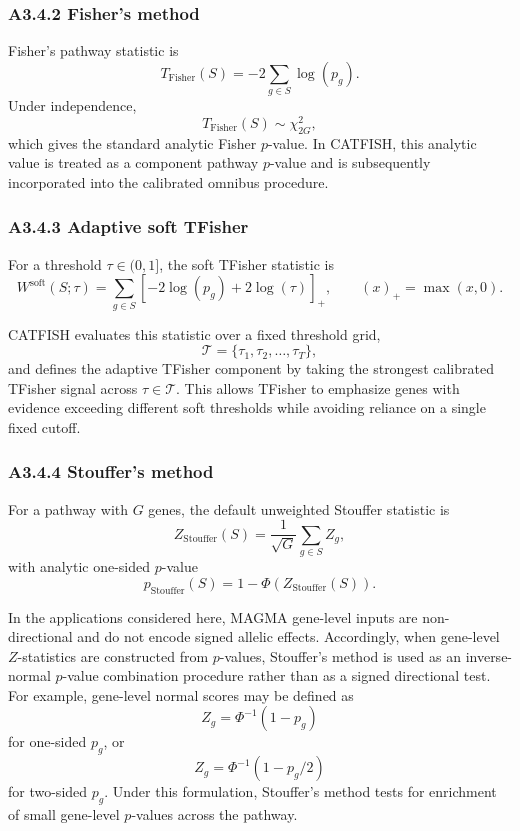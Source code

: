 \documentclass[unnumsec,webpdf,contemporary,large]{oup-authoring-template}%
\theoremstyle{thmstyleone}%
\theoremstyle{thmstyletwo}%
\theoremstyle{thmstylethree}%
\begin{document}
\begin{appendices}
\subsubsection{A3.4.2 Fisher's method}

Fisher's pathway statistic is
\[
T_{\mathrm{Fisher}}(S)
=
-2\sum_{g\in S}\log(p_g).
\]
Under independence,
\[
T_{\mathrm{Fisher}}(S)
\sim
\chi^2_{2G},
\]
which gives the standard analytic Fisher $p$-value. In CATFISH, this analytic value is treated as a component pathway $p$-value and is subsequently incorporated into the calibrated omnibus procedure.

\subsubsection{A3.4.3 Adaptive soft TFisher}

For a threshold $\tau \in (0,1]$, the soft TFisher statistic is
\[
W^{\mathrm{soft}}(S;\tau)
=
\sum_{g\in S}
\left[-2\log(p_g)+2\log(\tau)\right]_+,
\qquad
(x)_+ = \max(x,0).
\]

CATFISH evaluates this statistic over a fixed threshold grid,
\[
\mathcal{T}=\{\tau_1,\tau_2,\dots,\tau_T\},
\]
and defines the adaptive TFisher component by taking the strongest calibrated TFisher signal across $\tau \in \mathcal{T}$. This allows TFisher to emphasize genes with evidence exceeding different soft thresholds while avoiding reliance on a single fixed cutoff.

\subsubsection{A3.4.4 Stouffer's method}

For a pathway with $G$ genes, the default unweighted Stouffer statistic is
\[
Z_{\mathrm{Stouffer}}(S)
=
\frac{1}{\sqrt{G}}
\sum_{g\in S} Z_g,
\]
with analytic one-sided $p$-value
\[
p_{\mathrm{Stouffer}}(S)
=
1-\Phi\!\left(Z_{\mathrm{Stouffer}}(S)\right).
\]

In the applications considered here, MAGMA gene-level inputs are non-directional and do not encode signed allelic effects. Accordingly, when gene-level $Z$-statistics are constructed from $p$-values, Stouffer's method is used as an inverse-normal $p$-value combination procedure rather than as a signed directional test. For example, gene-level normal scores may be defined as
\[
Z_g=\Phi^{-1}(1-p_g)
\]
for one-sided $p_g$, or
\[
Z_g=\Phi^{-1}(1-p_g/2)
\]
for two-sided $p_g$. Under this formulation, Stouffer's method tests for enrichment of small gene-level $p$-values across the pathway.


\end{appendices}
\end{document}
